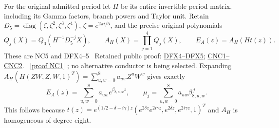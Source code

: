 \documentclass[11pt]{article}
\newcommand{\diag}{\operatorname{diag}}
\begin{document}
For the original admitted period let $H$ be its entire invertible period
matrix, including its Gamma factors, branch powers and Taylor unit.
Retain $D_5=\diag(\zeta,\zeta^2,\zeta^3,\zeta^4)$,
$\zeta=e^{2\pi i/5}$, and the precise original polynomials
\[
 Q_j(X)=Q_0(H^{-1}D_5^{-j}X),\qquad
 A_H(X)=\prod_{j=1}^4Q_j(X),\qquad
 E_A(z)=A_H(Ht(z)).
 \tag{FC13}
\]
These are NC5 and DFX4--5 \cite{NC,Cumulative}%
~Retained public proof: \href{https://github.com/KokunoYumeto/zeta-function-research-reader/blob/689a8f87e9c12b7a99b01b3123438c6751ee608f/workbenches/splitzero-tandem/continuations/20260921-directional-inverse-power/006/source_dependencies/ACCEPTED_782_CUMULATIVE.tex\#L30623}{DFX4--DFX5}; \href{https://github.com/KokunoYumeto/zeta-function-research-reader/blob/689a8f87e9c12b7a99b01b3123438c6751ee608f/workbenches/splitzero-tandem/continuations/20260921-directional-inverse-power/006/source_dependencies/ACCEPTED_782_CUMULATIVE.tex\#L38157}{CNC1--CNC2}.%
{}%
~\href{https://github.com/KokunoYumeto/zeta-function-research-reader/blob/5992ad50c0f2a06921f1fcaded7b4e38097c0739/workbenches/splitzero-tandem/continuations/20260920-original-kernel-mixed-determinants/providers/ORIGINAL_CONDUCTOR_COPRIMALITY.tex\#L41}{[proof NC1]}%
{}; no alternative conductor
is being selected. Expanding
$A_H(H(ZW,Z,W,1)^T)=\sum_{u,w=0}^8 a_{uw}Z^uW^w$ gives exactly
\[
 E_A(z)=\sum_{u,w=0}^8a_{uw}e^{\beta_{8,u,w}z},\qquad
 \mu_j=\sum_{u,w=0}^8a_{uw}\beta_{8,u,w}^{\,j}.
 \tag{FC14}
\]
This follows because
$t(z)=e^{(1/2-\delta-i\gamma)z}
(e^{2\delta z}e^{2i\gamma z},e^{2\delta z},e^{2i\gamma z},1)^T$
and $A_H$ is homogeneous of degree eight.
\end{document}
